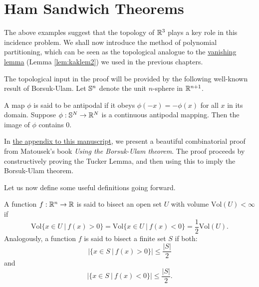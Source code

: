 \section{Ham Sandwich Theorems \label{sect:ham-sandwich-thms}}
The above examples suggest that the topology of $\mathbb R^3$ plays a key role in this incidence problem. We shall now introduce the method of polynomial partitioning,
which can be seen as the topological analogue to the \hyperref[lem:kaklem2]{vanishing lemma} (Lemma \ref{lem:kaklem2}) we used in the previous chapters. 

The topological input in the proof will be provided by the following well-known result of Borsuk-Ulam.
Let $\mathbb S^n$ denote the unit $n$-sphere in $\mathbb R^{n+1}$. 
\begin{theorem}
    A map $\phi$ is said to be antipodal if it obeys $\phi (-x) = -\phi(x)$ for all $x$ in its domain. Suppose $\phi: \mathbb S^N \to \mathbb R^N$ is a continuous antipodal mapping. 
    Then the image of $\phi$ contains 0. \label{thm:Borsuk-Ulam}
\end{theorem}
In \hyperref[appendix:Borsuk-Ulam]{the appendix to this manuscript}, we present a beautiful combinatorial proof from Matousek's book \textit{Using the Borsuk-Ulam theorem}.\cite{matouvsek2003using}
The proof proceeds by constructively proving the Tucker Lemma, and then using this to imply the Borsuk-Ulam theorem.

Let us now define some useful definitions going forward. 
\begin{definition}
A function $f :\mathbb R^n \to \mathbb R$ is said to bisect an open set $U$ with volume $\text{Vol}(U) < \infty$ if
\[
    \text{Vol}\{x \in U \ | \ f(x) > 0 \} = \text{Vol}\{x \in U \ | \ f(x) < 0 \} = \frac{1}{2} \text{Vol}(U).
\]
Analogously, a function $f$ is said to bisect a finite set $S$ if both:
\[
  |\{x \in S \ | \ f(x) > 0\}| \leq \frac{|S|}{2}   
\]
and 
\[
  |\{x \in S \ | \ f(x) < 0\}| \leq \frac{|S|}{2}.
\]

\end{definition}


